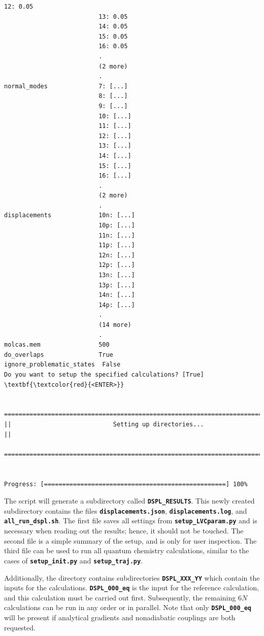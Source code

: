 \documentclass[a4paper,11pt,DIV=15,openany]{scrbook}
\newcommand{\ttt}[1]{\textbf{\texttt{#1}}}
\begin{document}
\begin{oframed}
\begin{Verbatim}[commandchars=\\\{\}]
                          12: 0.05
                          13: 0.05
                          14: 0.05
                          15: 0.05
                          16: 0.05
                          .
                          (2 more)
                          .
normal_modes              7: [...]
                          8: [...]
                          9: [...]
                          10: [...]
                          11: [...]
                          12: [...]
                          13: [...]
                          14: [...]
                          15: [...]
                          16: [...]
                          .
                          (2 more)
                          .
displacements             10n: [...]
                          10p: [...]
                          11n: [...]
                          11p: [...]
                          12n: [...]
                          12p: [...]
                          13n: [...]
                          13p: [...]
                          14n: [...]
                          14p: [...]
                          .
                          (14 more)
                          .
molcas.mem                500
do_overlaps               True
ignore_problematic_states  False
Do you want to setup the specified calculations? [True] \textbf{\textcolor{red}{<ENTER>}}

  ================================================================================
||                            Setting up directories...                           ||
  ================================================================================


Progress: [==================================================] 100%
\end{Verbatim}
\end{oframed}

\normalsize
The script will generate a subdirectory called \ttt{DSPL\_RESULTS}.
This newly created subdirectory contains the files \ttt{displacements.json}, \ttt{displacements.log}, and \ttt{all\_run\_dspl.sh}.
The first file saves all settings from \ttt{setup\_LVCparam.py} and is necessary when reading out the results; hence, it should not be touched.
The second file is a simple summary of the setup, and is only for user inspection.
The third file can be used to run all quantum chemistry calculations, similar to the cases of \ttt{setup\_init.py} and \ttt{setup\_traj.py}.

Additionally, the directory contains subdirectories \ttt{DSPL\_XXX\_YY} which contain the inputs for the calculations.
\ttt{DSPL\_000\_eq} is the input for the reference calculation, and this calculation must be carried out first.
Subsequently, the remaining $6N$ calculations can be run in any order or in parallel.
Note that only \ttt{DSPL\_000\_eq} will be present if analytical gradients and nonadiabatic couplings are both requested.
\end{document}
